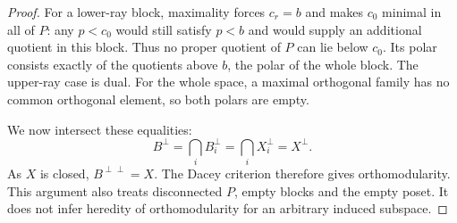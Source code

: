 \begin{proof}
For a lower-ray block, maximality forces $c_r=b$ and makes $c_0$
minimal in all of $P$: any $p<c_0$ would still satisfy $p<b$ and
would supply an additional quotient in this block. Thus no proper
quotient of $P$ can lie below $c_0$. Its polar consists exactly of
the quotients above $b$, the polar of the whole block. The upper-ray
case is dual. For the whole space, a maximal orthogonal family has
no common orthogonal element, so both polars are empty.

We now intersect these equalities:
\[
 B^{\perp}=\bigcap_i B_i^{\perp}
             =\bigcap_i X_i^{\perp}=X^{\perp}.
\]
As $X$ is closed, $B^{\perp\perp}=X$. The Dacey criterion
\citep[Theorem~3.3, p.~5]{Jenca2022} therefore gives orthomodularity.
This argument also treats disconnected $P$, empty blocks and the
empty poset. It does not infer heredity of orthomodularity for an
arbitrary induced subspace.
\end{proof}

